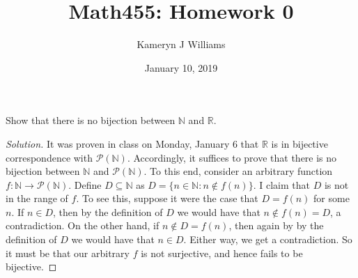 \documentclass{amsart}
\title{Math455: Homework 0}
\author{Kameryn J Williams}
\date{January 10, 2019}
\theoremstyle{plain}
\newenvironment{solution}{\begin{proof}[Solution]}{\end{proof}}
\newcommand\Nbb{\mathbb{N}}
\newcommand\Rbb{\mathbb{R}}
\newcommand\powerset{\mathcal{P}}
\begin{document}
\maketitle

\begin{exercise}
Show that there is no bijection between $\Nbb$ and $\Rbb$.
\end{exercise}

\begin{solution}
It was proven in class on Monday, January 6 that $\Rbb$ is in bijective correspondence with $\powerset(\Nbb)$. Accordingly, it suffices to prove that there is no bijection between $\Nbb$ and $\powerset(\Nbb)$. To this end, consider an arbitrary function $f \colon \Nbb \to \powerset(\Nbb)$. Define $D \subseteq \Nbb$ as $D = \{ n \in \Nbb : n \not \in f(n) \}$. I claim that $D$ is not in the range of $f$. To see this, suppose it were the case that $D = f(n)$ for some $n$. If $n \in D$, then by the definition of $D$ we would have that $n \not \in f(n) = D$, a contradiction. On the other hand, if $n \not \in D = f(n)$, then again by by the definition of $D$ we would have that $n \in D$. Either way, we get a contradiction. So it must be that our arbitrary $f$ is not surjective, and hence fails to be bijective.
\end{solution}
\end{document}
